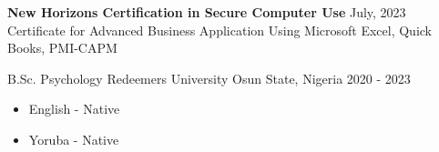 \documentclass[10pt, a4paper]{cvhari}
\begin{document}
    \medskip
    \medskip


    \medskip
    \cvachievement{\certificatesymbol}
    {{\bfseries New Horizons Certification in Secure Computer Use}}
    {July, 2023}
    {Certificate for Advanced Business Application Using Microsoft Excel, Quick Books, PMI-CAPM}\par

    \medskip


    \begin{multicols}{2}
        \medskip

        \education
        {B.Sc. Psychology}
        {Redeemers University}
        {Osun State, Nigeria}
        {2020 - 2023}
        \par

        \columnbreak
        \medskip
        \begin{itemize}
            \item English - Native
            \item Yoruba - Native
        \end{itemize}
    \end{multicols}
\end{document}
